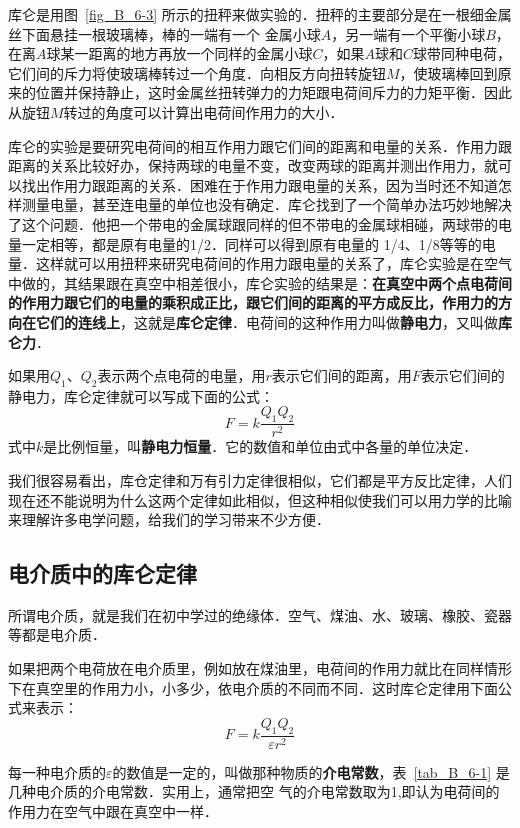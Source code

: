 库仑是用图~\ref{fig_B_6-3} 所示的扭秤来做实验的．扭秤的主要部分是在一根细金属丝下面悬挂一根玻璃棒，棒的一端有一个
金属小球$A$，另一端有一个平衡小球$B$，在离$A$球某一距离的地方再放一个同样的金属小球$C$，如果$A$球和$C$球带同种电荷，它们间的斥力将使玻璃棒转过一个角度．向相反方向扭转旋钮$M$，使玻璃棒回到原来的位置并保持静止，这时金属丝扭转弹力的力矩跟电荷间斥力的力矩平衡．因此从旋钮$M$转过的角度可以计算出电荷间作用力的大小．

库仑的实验是要研究电荷间的相互作用力跟它们间的距离和电量的关系．作用力跟距离的关系比较好办，保持两球的电量不变，改变两球的距离并测出作用力，就可以找出作用力跟距离的关系．困难在于作用力跟电量的关系，因为当时还不知道怎样测量电量，甚至连电量的单位也没有确定．库仑找到了一个简单办法巧妙地解决了这个问题．他把一个带电的金属球跟同样的但不带电的金属球相碰，两球带的电量一定相等，都是原有电量的1/2．同样可以得到原有电量的
1/4、1/8等等的电量．这样就可以用扭秤来研究电荷间的作用力跟电量的关系了，库仑实验是在空气中做的，其结果跟在真空中相差很小，库仑实验的结果是：\textbf{在真空中两个点电荷间的作用力跟它们的电量的乘积成正比，跟它们间的距离的平方成反比，作用力的方向在它们的连线上}，这就是\textbf{库仑定律}．电荷间的这种作用力叫做\textbf{静电力}，又叫做\textbf{库仑力}．

如果用$Q_1$、$Q_2$表示两个点电荷的电量，用$r$表示它们间的距离，用$F$表示它们间的静电力，库仑定律就可以写成下面的公式：
\begin{equation}
F=k\frac{Q_1Q_2}{r^2}
\end{equation}
式中$k$是比例恒量，叫\textbf{静电力恒量}．它的数值和单位由式中各量的单位决定．

我们很容易看出，库仓定律和万有引力定律很相似，它们都是平方反比定律，人们现在还不能说明为什么这两个定律如此相似，但这种相似使我们可以用力学的比喻来理解许多电学问题，给我们的学习带来不少方便．

\subsection{电介质中的库仑定律} 

所谓电介质，就是我们在初中学过的绝缘体．空气、煤油、水、玻璃、橡胶、瓷器等都是电介质．

如果把两个电荷放在电介质里，例如放在煤油里，电荷间的作用力就比在同样情形下在真空里的作用力小，小多少，依电介质的不同而不同．这时库仑定律用下面公式来表示：
\begin{equation}
F=k\frac{Q_1Q_2}{\varepsilon r^2}
\end{equation}

每一种电介质的$\varepsilon$的数值是一定的，叫做那种物质的\textbf{介电常数}，表~\ref{tab_B_6-1} 是几种电介质的介电常数．实用上，通常把空
气的介电常数取为1,即认为电荷间的作用力在空气中跟在真空中一样．

